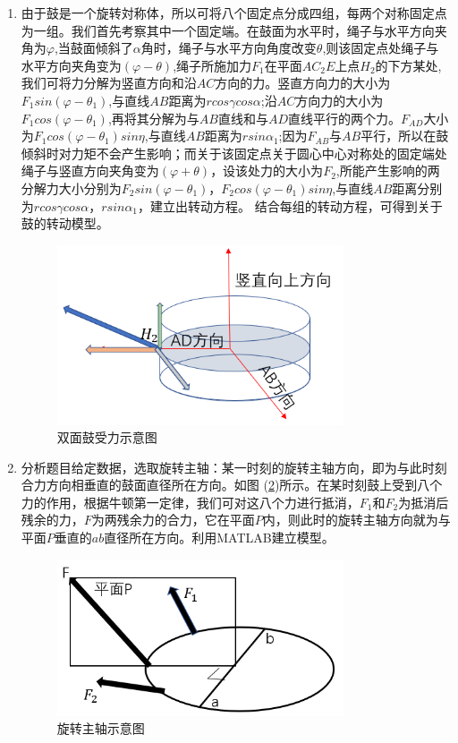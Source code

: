 \documentclass{cumcm}
\begin{document}
\begin{enumerate}
\item 由于鼓是一个旋转対称体，所以可将八个固定点分成四组，每两个对称固定点为一组。我们首先考察其中一个固定端。在鼓面为水平时，绳子与水平方向夹角为$\varphi$,当鼓面倾斜了$\alpha$角时，绳子与水平方向角度改变$\theta$,则该固定点处绳子与水平方向夹角变为$(\varphi-\theta)$,绳子所施加力$F_1$在平面$AC_2E$上点$H_2$的下方某处,我们可将力分解为竖直方向和沿$AC$方向的力。竖直方向力的大小为$F_1sin(\varphi-\theta_1)$,与直线$AB$距离为$rcos\gamma cos\alpha$;沿$AC$方向力的大小为$F_1cos(\varphi-\theta_1)$,再将其分解为与$AB$直线和与$AD$直线平行的两个力。$F_{AD}$大小为$F_1cos(\varphi-\theta_1)sin\eta$,与直线$AB$距离为$rsin\alpha_1$;因为$F_{AB}$与$AB$平行，所以在鼓倾斜时对力矩不会产生影响；而关于该固定点关于圆心中心对称处的固定端处绳子与竖直方向夹角变为$(\varphi+\theta)$，设该处力的大小为$F_2$,所能产生影响的两分解力大小分别为$F_2sin(\varphi-\theta_1)$，$F_2cos(\varphi-\theta_1)sin\eta$,与直线$AB$距离分别为$rcos\gamma cos\alpha$，$rsin\alpha_1$，建立出转动方程。 结合每组的转动方程，可得到关于鼓的转动模型。
\begin{figure}[H]
\centering
\includegraphics[width=0.8\textwidth]{img/fight.png}
\caption{双面鼓受力示意图}\label{fig:fight}
\end{figure}
\item 分析题目给定数据，选取旋转主轴：某一时刻的旋转主轴方向，即为与此时刻合力方向相垂直的鼓面直径所在方向。如图 (\ref{figmain})所示。在某时刻鼓上受到八个力的作用，根据牛顿第一定律，我们可对这八个力进行抵消，$F_1$和$F_2$为抵消后残余的力，$F$为两残余力的合力，它在平面$P$内，则此时的旋转主轴方向就为与平面$P$垂直的$ab$直径所在方向。利用MATLAB建立模型。

\begin{figure}[H]
\centering
\includegraphics[width=0.8\textwidth]{img/main.png}
\caption{旋转主轴示意图}\label{figmain}
\end{figure}


\end{enumerate}
\end{document}
